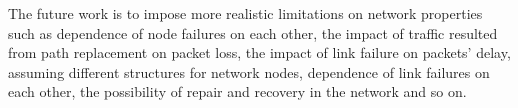\documentclass[conference]{IEEEtran}
\begin{document}
    The future work is to impose more realistic limitations on network properties such as dependence of node failures on each other, the impact of traffic resulted from path replacement on packet loss, the impact of link failure on packets' delay, assuming different structures for network nodes, dependence of link failures on each other, the possibility of repair and recovery in the network and so on.
\end{document}
